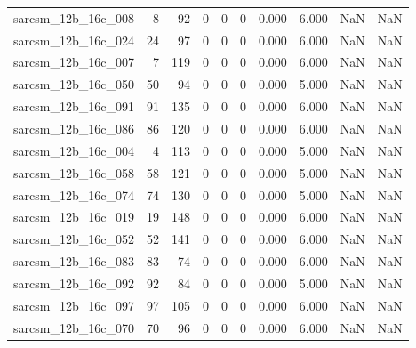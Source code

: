 \documentclass{article}
\begin{document}
\begin{longtable}{lrrrrrrrrr}
sarcsm\_12b\_16c\_008 & 8 & 92 & 0 & 0 & 0 & 0.000 & 6.000 & NaN & NaN \\
sarcsm\_12b\_16c\_024 & 24 & 97 & 0 & 0 & 0 & 0.000 & 6.000 & NaN & NaN \\
sarcsm\_12b\_16c\_007 & 7 & 119 & 0 & 0 & 0 & 0.000 & 6.000 & NaN & NaN \\
sarcsm\_12b\_16c\_050 & 50 & 94 & 0 & 0 & 0 & 0.000 & 5.000 & NaN & NaN \\
sarcsm\_12b\_16c\_091 & 91 & 135 & 0 & 0 & 0 & 0.000 & 6.000 & NaN & NaN \\
sarcsm\_12b\_16c\_086 & 86 & 120 & 0 & 0 & 0 & 0.000 & 6.000 & NaN & NaN \\
sarcsm\_12b\_16c\_004 & 4 & 113 & 0 & 0 & 0 & 0.000 & 5.000 & NaN & NaN \\
sarcsm\_12b\_16c\_058 & 58 & 121 & 0 & 0 & 0 & 0.000 & 5.000 & NaN & NaN \\
sarcsm\_12b\_16c\_074 & 74 & 130 & 0 & 0 & 0 & 0.000 & 5.000 & NaN & NaN \\
sarcsm\_12b\_16c\_019 & 19 & 148 & 0 & 0 & 0 & 0.000 & 6.000 & NaN & NaN \\
sarcsm\_12b\_16c\_052 & 52 & 141 & 0 & 0 & 0 & 0.000 & 6.000 & NaN & NaN \\
sarcsm\_12b\_16c\_083 & 83 & 74 & 0 & 0 & 0 & 0.000 & 6.000 & NaN & NaN \\
sarcsm\_12b\_16c\_092 & 92 & 84 & 0 & 0 & 0 & 0.000 & 5.000 & NaN & NaN \\
sarcsm\_12b\_16c\_097 & 97 & 105 & 0 & 0 & 0 & 0.000 & 6.000 & NaN & NaN \\
sarcsm\_12b\_16c\_070 & 70 & 96 & 0 & 0 & 0 & 0.000 & 6.000 & NaN & NaN \\
\end{longtable}
\end{document}
